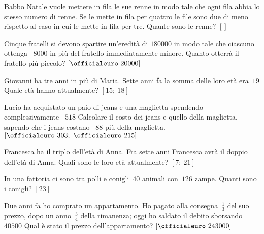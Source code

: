 \begin{multicols}{2}
\begin{esercizio}[\Ast]
\label{ese:14.57}
Babbo Natale vuole mettere in fila le sue renne in modo tale che ogni fila abbia 
lo stesso numero di renne. Se le mette in fila per quattro le file sono due di 
meno rispetto al caso in cui le mette in fila per tre. Quante sono le renne?
 \hfill $\left[\right]$
\end{esercizio}

\begin{esercizio}[\Ast]
\label{ese:14.58}
Cinque fratelli si devono spartire un'eredità di \officialeuro$180000$ in modo 
tale che ciascuno ottenga \officialeuro~$8000$ in più del fratello 
immediatamente minore. Quanto otterrà il fratello più piccolo?
 \hfill $\left[\officialeuro~20000\right]$
\end{esercizio}

\begin{esercizio}[\Ast]
\label{ese:14.59}
Giovanni ha tre anni in più di Maria. Sette anni fa la somma delle loro età 
era~$19$ Quale età hanno attualmente? \hfill $\left[15;~18\right]$
\end{esercizio}

\begin{esercizio}[\Ast]
\label{ese:14.60}
Lucio ha acquistato un paio di jeans e una maglietta spendendo complessivamente 
\officialeuro~$518$ Calcolare il costo dei jeans e quello della maglietta, 
sapendo che i jeans costano \officialeuro~$88$ più della maglietta.
 \hfill $\left[\officialeuro~303;~\officialeuro~215\right]$
\end{esercizio}

\begin{esercizio}[\Ast]
\label{ese:14.61}
Francesca ha il triplo dell'età di Anna. Fra sette anni Francesca avrà il doppio 
dell'età di Anna. Quali sono le loro età attualmente? 
\hfill $\left[7;~21\right]$
\end{esercizio}

\begin{esercizio}[\Ast]
\label{ese:14.62}
In una fattoria ci sono tra polli e conigli~$40$ animali con~$126$ zampe. Quanti 
sono i conigli? \hfill $\left[23\right]$
\end{esercizio}

\begin{esercizio}[\Ast]
\label{ese:14.63}
Due anni fa ho comprato un appartamento. Ho pagato alla consegna~$\frac{1}{3}$ 
del suo prezzo, dopo un anno~$\frac{3}{4}$ della rimanenza; oggi ho saldato il 
debito sborsando \officialeuro~$40500$ Qual è stato il prezzo dell'appartamento?
 \hfill $\left[\officialeuro~243000\right]$
\end{esercizio}


\end{multicols}
